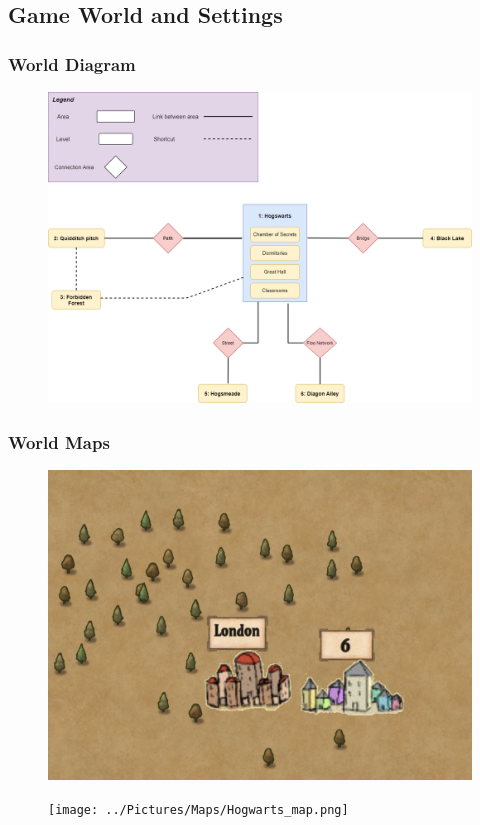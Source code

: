 \subsection{Game World and Settings}

\subsubsection{World Diagram}
\begin{figure}[H]
\includegraphics[max width=\textwidth]{../Pictures/Maps/World_diagram.png}
\end{figure}

\subsubsection*{World Maps}
\begin{figure}[H]
\includegraphics[max width=\textwidth]{../Pictures/Maps/Diagon_Alley_map.png}
\end{figure}
\begin{figure}[H]
\texttt{[image: ../Pictures/Maps/Hogwarts\_map.png]}
\end{figure}

